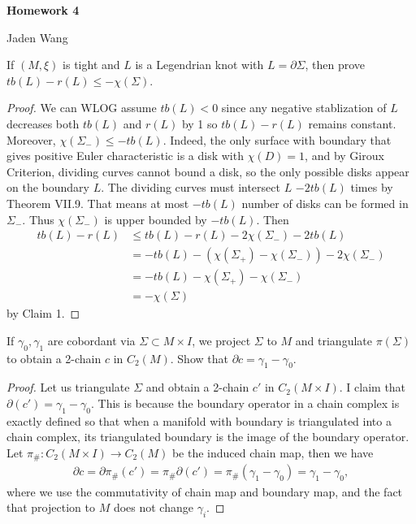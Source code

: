 \documentclass[12pt]{article}
\begin{document}
\centerline {\textsf{\textbf{\LARGE{Homework 4}}}}
\centerline {Jaden Wang}
\vspace{.15in}

\begin{problem}
If $ (M,\xi)$ is tight and $ L$ is a Legendrian knot with $ L = \partial \Sigma $, then prove $ tb(L)-r(L) \leq - \chi( \Sigma )$.

\begin{proof}
We can WLOG assume $ tb(L)<0$ since any negative stablization of  $ L$ decreases both $ tb(L)$ and $ r(L)$ by 1 so $ tb(L) - r(L)$ remains constant. Moreover, $ \chi( \Sigma _-) \leq -tb(L)$. Indeed, the only surface with boundary that gives positive Euler characteristic is a disk with $ \chi(D)=1$, and by Giroux Criterion, dividing curves cannot bound a disk, so the only possible disks appear on the boundary $ L$. The dividing curves must intersect $ L$ $ -2tb(L)$ times by Theorem VII.9. That means at most $ -tb(L)$ number of disks can be formed in  $ \Sigma _-$. Thus $ \chi( \Sigma _-)$ is upper bounded by $ -tb(L)$. Then
\begin{align*}
	tb(L) - r(L) &\leq tb(L) - r(L) - 2\chi( \Sigma _-) - 2 tb(L)\\
	&= -tb(L) - ( \chi( \Sigma _+) - \chi( \Sigma _-)) - 2 \chi( \Sigma_-) \\
	&= -tb(L) -   \chi( \Sigma _+) - \chi( \Sigma _-)\\
	&= - \chi( \Sigma ) 
\end{align*}
by Claim 1.
\end{proof}
\end{problem}
\begin{problem}[2: IV Lemma 4]
If $ \gamma_0, \gamma_1$ are cobordant via $ \Sigma \subset M \times I$, we project $ \Sigma $ to $ M$ and triangulate $ \pi( \Sigma )$ to obtain a 2-chain $ c$ in $ C_2(M)$. Show that $ \partial c  = \gamma_1 - \gamma_0$.
\begin{proof}
Let us triangulate $ \Sigma $ and obtain a 2-chain $ c'$ in $ C_2(M \times I)$. I claim that $ \partial( c') = \gamma_1 - \gamma_0$. This is because the boundary operator in a chain complex is exactly defined so that when a manifold with boundary is triangulated into a chain complex, its triangulated boundary is the image of the boundary operator. Let $ \pi_\# : C_2(M \times I) \to C_2(M)$ be the induced chain map, then we have
\begin{align*}
	\partial c = \partial \pi_\# (c') = \pi_\# \partial (c') = \pi_\# ( \gamma_1 - \gamma_0) = \gamma_1 - \gamma_0 , 
\end{align*}
where we use the commutativity of chain map and boundary map, and the fact that projection to $ M$ does not change  $ \gamma_i$.
\end{proof}
\end{problem}
\end{document}

